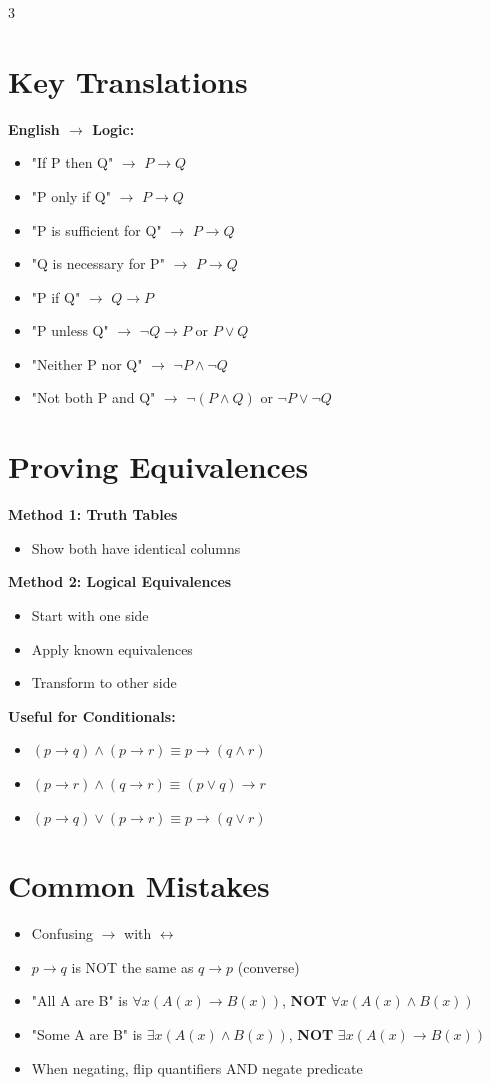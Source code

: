 \documentclass[8pt]{article}
\begin{document}
\begin{multicols}{3}
\section*{Key Translations}
\textbf{English $\to$ Logic:}
\begin{itemize}[nosep]
\item "If P then Q" $\to$ $P \to Q$
\item "P only if Q" $\to$ $P \to Q$
\item "P is sufficient for Q" $\to$ $P \to Q$
\item "Q is necessary for P" $\to$ $P \to Q$
\item "P if Q" $\to$ $Q \to P$
\item "P unless Q" $\to$ $\neg Q \to P$ or $P \lor Q$
\item "Neither P nor Q" $\to$ $\neg P \land \neg Q$
\item "Not both P and Q" $\to$ $\neg(P \land Q)$ or $\neg P \lor \neg Q$
\end{itemize}

\section*{Proving Equivalences}
\textbf{Method 1: Truth Tables}
\begin{itemize}[nosep]
\item Show both have identical columns
\end{itemize}

\textbf{Method 2: Logical Equivalences}
\begin{itemize}[nosep]
\item Start with one side
\item Apply known equivalences
\item Transform to other side
\end{itemize}

\textbf{Useful for Conditionals:}
\begin{itemize}[nosep]
\item $(p \to q) \land (p \to r) \equiv p \to (q \land r)$
\item $(p \to r) \land (q \to r) \equiv (p \lor q) \to r$
\item $(p \to q) \lor (p \to r) \equiv p \to (q \lor r)$
\end{itemize}

\section*{Common Mistakes}
\begin{itemize}[nosep]
\item Confusing $\to$ with $\leftrightarrow$
\item $p \to q$ is NOT the same as $q \to p$ (converse)
\item "All A are B" is $\forall x (A(x) \to B(x))$, \textbf{NOT} $\forall x (A(x) \land B(x))$
\item "Some A are B" is $\exists x (A(x) \land B(x))$, \textbf{NOT} $\exists x (A(x) \to B(x))$
\item When negating, flip quantifiers AND negate predicate
\end{itemize}


\end{multicols}
\end{document}
